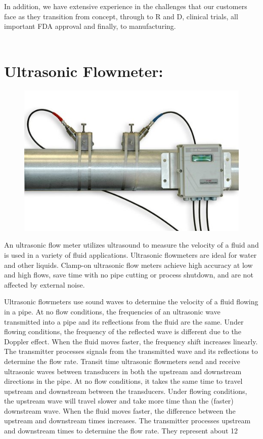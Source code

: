 \documentclass[a4paper,12pt]{article}
\begin{document}
In addition, we have extensive experience in the challenges that our customers face as they transition from concept, through to R and D, clinical trials, all important FDA approval and finally, to manufacturing.
\\
\\  

  
  
\section{Ultrasonic Flowmeter:}
\begin{figure}[h]
\includegraphics[scale=0.36]{ult.jpg}
\end{figure}  
  
  An ultrasonic flow meter utilizes ultrasound to measure the velocity of a fluid and is used in a variety of fluid applications. Ultrasonic flowmeters are ideal for water and other liquids. Clamp-on ultrasonic flow meters achieve high accuracy at low and high flows, save time with no pipe cutting or process shutdown, and are not affected by external noise.
  

  Ultrasonic flowmeters use sound waves to determine the velocity of a fluid flowing in a pipe. At no flow conditions, the frequencies of an ultrasonic wave transmitted into a pipe and its reflections from the fluid are the same. Under flowing conditions, the frequency of the reflected wave is different due to the Doppler effect. When the fluid moves faster, the frequency shift increases linearly. The transmitter processes signals from the transmitted wave and its reflections to determine the flow rate.
  Transit time ultrasonic flowmeters send and receive ultrasonic waves between transducers in both the upstream and downstream directions in the pipe. At no flow conditions, it takes the same time to travel upstream and downstream between the transducers. Under flowing conditions, the upstream wave will travel slower and take more time than the (faster) downstream wave. When the fluid moves faster, the difference between the upstream and downstream times increases. The transmitter processes upstream and downstream times to determine the flow rate. They represent about 12%
  
\end{document}
